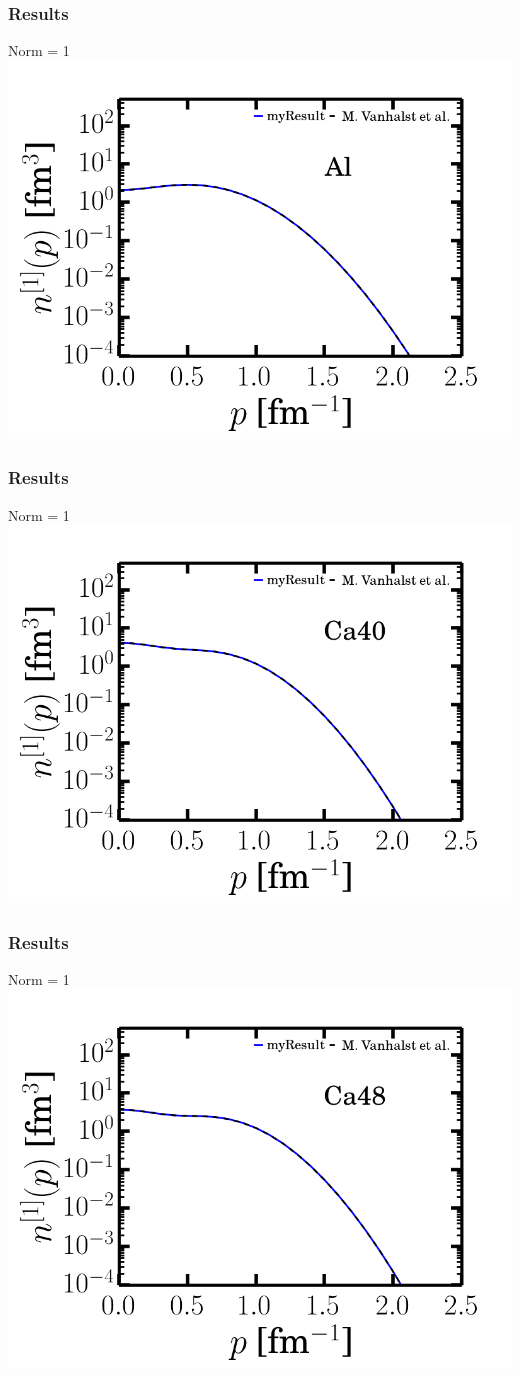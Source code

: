 \documentclass{beamer}
\begin{document}
\begin{frame}
\frametitle{Results}
Norm = 1
\includegraphics[scale=0.5]{Al_mf.png} 
\end{frame}
\begin{frame}
\frametitle{Results}
Norm = 1
\includegraphics[scale=0.5]{Ca40_mf.png} 
\end{frame}
\begin{frame}
\frametitle{Results}
Norm = 1
\includegraphics[scale=0.5]{Ca48_mf.png} 
\end{frame}
\end{document}
